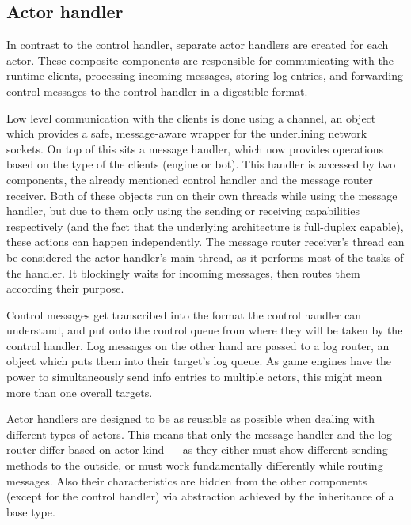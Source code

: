 		\subsection{Actor handler}

		In contrast to the control handler, separate actor handlers are created for each actor. These composite components are responsible for communicating with the runtime clients, processing incoming messages, storing log entries, and forwarding control messages to the control handler in a digestible format.
		
		Low level communication with the clients is done using a channel, an object which provides a safe, message-aware wrapper for the underlining network sockets. On top of this sits a message handler, which now provides operations based on the type of the clients (engine or bot). This handler is accessed by two components, the already mentioned control handler and the message router receiver. Both of these objects run on their own threads while using the message handler, but due to them only using the sending or receiving capabilities respectively (and the fact that the underlying architecture is full-duplex capable), these actions can happen independently. The message router receiver's thread can be considered the actor handler's main thread, as it performs most of the tasks of the handler. It blockingly waits for incoming messages, then routes them according their purpose. 

		Control messages get transcribed into the format the control handler can understand, and put onto the control queue from where they will be taken by the control handler. Log messages on the other hand are passed to a log router, an object which puts them into their target's log queue. As game engines have the power to simultaneously send info entries to multiple actors, this might mean more than one overall targets.
		
		Actor handlers are designed to be as reusable as possible when dealing with different types of actors. This means that only the message handler and the log router differ based on actor kind --- as they either must show different sending methods to the outside, or must work fundamentally differently while routing messages. Also their characteristics are hidden from the other components (except for the control handler) via abstraction achieved by the inheritance of a base type. 

